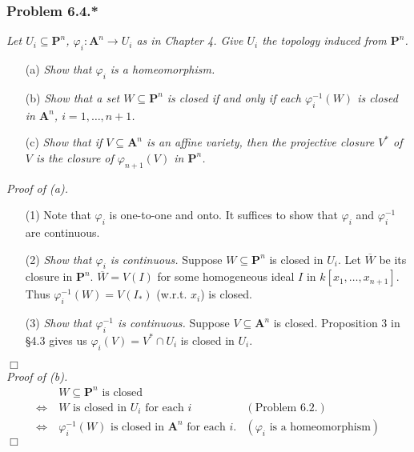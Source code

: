 \documentclass{article}
\begin{document}
\subsubsection*{Problem 6.4.*}
\emph{Let $U_i \subseteq \mathbf{P}^{n}$, $\varphi_i: \mathbf{A}^{n} \to U_i$ as in Chapter 4.
Give $U_i$ the topology induced from $\mathbf{P}^{n}$.}
\begin{enumerate}
\item[(a)]
  \emph{Show that $\varphi_i$ is a homeomorphism.}

\item[(b)]
  \emph{Show that a set $W \subseteq \mathbf{P}^{n}$ is closed if and only if
  each $\varphi_i^{-1}(W)$ is closed in $\mathbf{A}^{n}$, $i = 1,\ldots,n+1$.}

\item[(c)]
  \emph{Show that if $V \subseteq \mathbf{A}^{n}$ is an affine variety,
  then the projective closure $V^{*}$ of $V$ is the closure of
 $\varphi_{n+1}(V)$ in $\mathbf{P}^{n}$.} \\
\end{enumerate}



\emph{Proof of (a).}
\begin{enumerate}
\item[(1)]
  Note that $\varphi_i$ is one-to-one and onto.
  It suffices to show that $\varphi_i$ and $\varphi_i^{-1}$ are continuous.

\item[(2)]
  \emph{Show that $\varphi_i$ is continuous.}
  Suppose $W \subseteq \mathbf{P}^{n}$ is closed in $U_i$.
  Let $\overline{W}$ be its closure in $\mathbf{P}^{n}$.
  $\overline{W} = V(I)$ for some homogeneous ideal $I$ in $k[x_1,\ldots,x_{n+1}]$.
  Thus $\varphi_i^{-1}(W) = V(I_{*})$ (w.r.t. $x_i$) is closed.

\item[(3)]
  \emph{Show that $\varphi_i^{-1}$ is continuous.}
  Suppose $V \subseteq \mathbf{A}^{n}$ is closed.
  Proposition 3 in \S 4.3 gives us $\varphi_{i}(V) = V^{*} \cap U_i$ is closed in $U_i$.
\end{enumerate}
$\Box$ \\



\emph{Proof of (b).}
  \begin{align*}
    & \: \text{$W \subseteq \mathbf{P}^{n}$ is closed} \\
    \Longleftrightarrow & \:
    \text{$W$ is closed in $U_i$ for each $i$}
      &(\text{Problem 6.2.}) \\
    \Longleftrightarrow & \:
    \text{$\varphi_i^{-1}(W)$ is closed in $\mathbf{A}^{n}$ for each $i$}.
      &(\text{$\varphi_i$ is a homeomorphism})
  \end{align*}
$\Box$ \\
\end{document}
